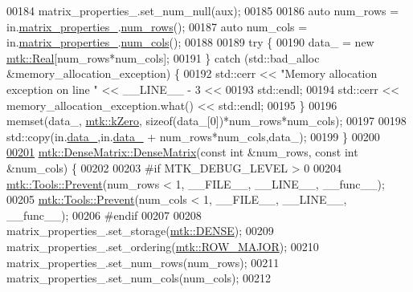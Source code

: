 \begin{DoxyCode}
00184   matrix\_properties\_.set\_num\_null(aux);
00185 
00186   \textcolor{keyword}{auto} num\_rows = in.\hyperlink{classmtk_1_1DenseMatrix_a481c8d09af685a5ba67acefdcaa810cc}{matrix\_properties\_}.\hyperlink{classmtk_1_1Matrix_ab308b25b48e4fcd39fc60e0c3fc66dea}{num\_rows}();
00187   \textcolor{keyword}{auto} num\_cols = in.\hyperlink{classmtk_1_1DenseMatrix_a481c8d09af685a5ba67acefdcaa810cc}{matrix\_properties\_}.\hyperlink{classmtk_1_1Matrix_a2160118d0edf51cf2aaa806ee1b915f8}{num\_cols}();
00188 
00189   \textcolor{keywordflow}{try} \{
00190     data\_ = \textcolor{keyword}{new} \hyperlink{group__c01-roots_gac080bbbf5cbb5502c9f00405f894857d}{mtk::Real}[num\_rows*num\_cols];
00191   \} \textcolor{keywordflow}{catch} (std::bad\_alloc &memory\_allocation\_exception) \{
00192     std::cerr << \textcolor{stringliteral}{"Memory allocation exception on line "} << \_\_LINE\_\_ - 3 <<
00193       std::endl;
00194     std::cerr << memory\_allocation\_exception.what() << std::endl;
00195   \}
00196   memset(data\_, \hyperlink{group__c01-roots_ga59a451a5fae30d59649bcda274fea271}{mtk::kZero}, \textcolor{keyword}{sizeof}(data\_[0])*num\_rows*num\_cols);
00197 
00198   std::copy(in.\hyperlink{classmtk_1_1DenseMatrix_a7893e4e5c8d2e2de32b156177e78cb6f}{data\_},in.\hyperlink{classmtk_1_1DenseMatrix_a7893e4e5c8d2e2de32b156177e78cb6f}{data\_} + num\_rows*num\_cols,data\_);
00199 \}
00200 
\hypertarget{mtk__dense__matrix_8cc_source_l00201}{}\hyperlink{classmtk_1_1DenseMatrix_abe26c623467fc1b293cf4f22a3a47cc8}{00201} \hyperlink{classmtk_1_1DenseMatrix_a0c75ee704707983f935b02835eab0933}{mtk::DenseMatrix::DenseMatrix}(\textcolor{keyword}{const} \textcolor{keywordtype}{int} &num\_rows, \textcolor{keyword}{const} \textcolor{keywordtype}{int} &num\_cols) \{
00202 
00203 \textcolor{preprocessor}{  #if MTK\_DEBUG\_LEVEL > 0}
00204   \hyperlink{classmtk_1_1Tools_a332324c6f25e66be9dff48c5987a3b9f}{mtk::Tools::Prevent}(num\_rows < 1, \_\_FILE\_\_, \_\_LINE\_\_, \_\_func\_\_);
00205   \hyperlink{classmtk_1_1Tools_a332324c6f25e66be9dff48c5987a3b9f}{mtk::Tools::Prevent}(num\_cols < 1, \_\_FILE\_\_, \_\_LINE\_\_, \_\_func\_\_);
00206 \textcolor{preprocessor}{  #endif}
00207 
00208   matrix\_properties\_.set\_storage(\hyperlink{namespacemtk_ga25b67ec6a2afeee69f9bb196a9c66619a00a806d43a7d74e9ccca47a2134e9c87}{mtk::DENSE});
00209   matrix\_properties\_.set\_ordering(\hyperlink{namespacemtk_ga622801bd9f912d0f976c3e383f5f581cabc55178ac16eb1ce89b5f3ab915a91f3}{mtk::ROW\_MAJOR});
00210   matrix\_properties\_.set\_num\_rows(num\_rows);
00211   matrix\_properties\_.set\_num\_cols(num\_cols);
00212 

\end{DoxyCode}
